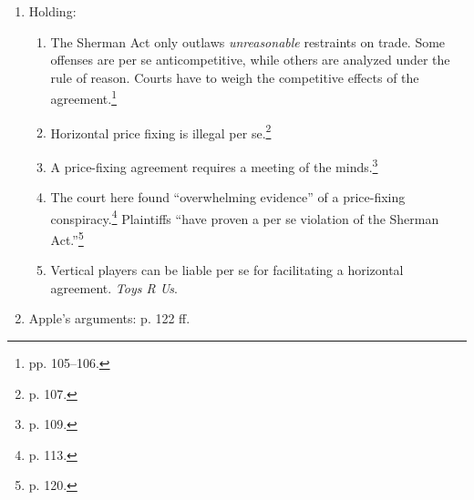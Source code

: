 \begin{enumerate}
\begin{enumerate}
        \item Soon, the ebooks saw ``sudden and uniform price increases'' across 
        the market.\footnote{p. 94.} ``The publisher defendants used the change 
        to an agency method for distributing their e-books as an opportunity to 
        raise the prices for their e-books across the board.''\footnote{p. 96.}
        \item The publishers lost sales as a result of the price increases, and 
        consumers suffered because they had to pay more for ebooks, buy cheaper 
        ebooks, or defer purchases entirely.\footnote{p. 98.}
    \end{enumerate}
    \item Holding:
    \begin{enumerate}
        \item The Sherman Act only outlaws \emph{unreasonable} restraints on 
        trade. Some offenses are per se anticompetitive, while others are 
        analyzed under the rule of reason. Courts have to weigh the competitive 
        effects of the agreement.\footnote{pp. 105--106.}
        \item Horizontal price fixing is illegal per se.\footnote{p. 107.}
        \item A price-fixing agreement requires a meeting of the 
        minds.\footnote{p. 109.}
        \item The court here found ``overwhelming evidence'' of a price-fixing 
        conspiracy.\footnote{p. 113.} Plaintiffs ``have proven a per se 
        violation of the Sherman Act.''\footnote{p. 120.}
        \item Vertical players can be liable per se for facilitating a 
        horizontal agreement. \emph{Toys R Us}.
    \end{enumerate}
    \item Apple's arguments: p. 122 ff.
\end{enumerate}
